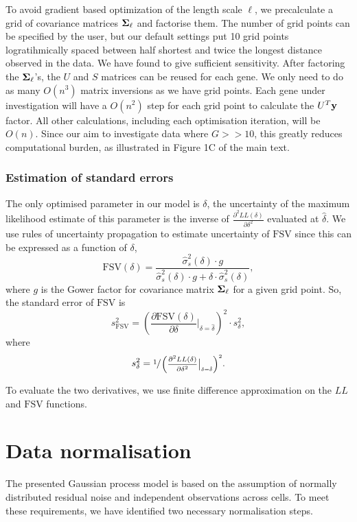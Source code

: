 To avoid gradient based optimization of the length scale \( \ell \), we precalculate a grid of covariance matrices \( \mbox{\boldmath $\Sigma$}_\ell \) and factorise them. The number of grid points can be specified by the user, but our default settings put 10 grid points logratihmically spaced between half shortest and twice the longest distance observed in the data. We have found to give sufficient sensitivity. After factoring the \( \mbox{\boldmath $\Sigma$}_\ell \)'s, the \( U \) and \( S \) matrices can be reused for each gene. We only need to do as many \( O(n^3) \) matrix inversions as we have grid points. Each gene under investigation will have a \( O(n^2) \) step for each grid point to calculate the \( U^T{\bf y} \) factor. All other calculations, including each optimisation iteration, will be \( O(n) \). Since our aim to investigate data where \( G >> 10 \), this greatly reduces computational burden, as illustrated in Figure 1C of the main text.

\subsubsection*{Estimation of standard errors}

The only optimised parameter in our model is \( \delta \), the uncertainty of the maximum likelihood estimate of this parameter is the inverse of \( \frac{\partial^2 LL(\delta)}{\partial \delta^2} \) evaluated at \( \hat{\delta} \). We use rules of uncertainty propagation to estimate uncertainty of \( \text{FSV} \) since this can be expressed as a function of \( \delta \),
\[
\text{FSV}(\delta) = \frac{\hat{\sigma}^2_s(\delta) \cdot g}{\hat{\sigma}^2_s(\delta) \cdot g + \delta \cdot \hat{\sigma}^2_s(\delta)},
\]
where \( g \) is the Gower factor for covariance matrix \( \mbox{\boldmath $\Sigma$}_\ell \) for a given grid point. So, the standard error of \( \text{FSV} \) is
\[
s_{\text{FSV}}^2 = \left(\frac{\partial \text{FSV}(\delta)}{\partial \delta} \Bigr|_{\delta = \hat{\delta}}\right)^2 \cdot s_\delta^2,
\]
where
\[
s^2_\delta = \sfrac{1}{\left(\frac{\partial^2 LL(\delta)}{\partial \delta^2} \Bigr|_{\delta = \hat{\delta}}\right)^2}.
\]

To evaluate the two derivatives, we use finite difference approximation on the \( LL \) and \( \text{FSV} \) functions.

\section{Data normalisation}

The presented Gaussian process model is based on the assumption of normally distributed residual noise and independent observations across cells. To meet these requirements, we have identified two necessary normalisation steps.

